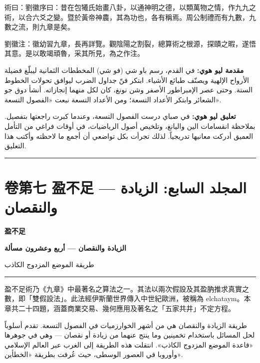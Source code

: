 \documentclass[11pt,a4paper]{article}
\newcommand{\ar}[1]{\arabicfont\beginR #1\endR}
\newcommand{\longline}{\noindent\rule{\textwidth}{0.4pt}}
\newcommand{\ChinCol}[1]{\begin{minipage}[t]{0.48\textwidth}#1\end{minipage}}
\newcommand{\ArabCol}[1]{\begin{minipage}[t]{0.48\textwidth}\arabicfont\beginR #1\endR\end{minipage}}
\newcommand{\parallelsection}[2]{%
  \noindent\ChinCol{#1}\hfill\ArabCol{#2}\par\vspace{0.5cm}%
}
\newcounter{probnum}
\begin{document}
\parallelsection{%
術曰：劉徽序曰：昔在包犧氏始畫八卦，以通神明之德，以類萬物之情，作九九之術，以合六爻之變。暨於黃帝神農，其為功也，各有稱焉。周公制禮而有九數，九數之流，則九章是矣。

劉徽注：徽幼習九章，長再詳覽。觀陰陽之割裂，總算術之根源，探賾之暇，遂悟其意。是以敢竭頑魯，采其所見，為之作注。
}{%
\textbf{مقدمة ليو هوي:} في القدم، رسم باو شي (فو شي) المخططات الثمانية ليبلّغ فضيلة الأرواح الإلهية ويصنّف طبائع الأشياء. ابتكر فنّ جداول الضرب ليوافق تحولات الخطوط الستة. وحتى عصر الإمبراطور الأصفر وشن نونغ، كان لكل منهما إنجازاته. أنشأ دوق جو الشعائر وابتكر الأعداد التسعة؛ ومن الأعداد التسعة نبعت «الفصول التسعة».

\textbf{تعليق ليو هوي:} في صباي درست الفصول التسعة، وعندما كبرت راجعتها بتفصيل. بملاحظة انقسامات الين واليانغ، وتلخيص أصول الرياضيات، في أوقات فراغي من التأمل العميق أدركت معانيها تدريجياً. لذلك تجرأت بكل تواضعي أن أجمع ما لاحظته وأكتب هذا التعليق.
}

\vspace{0.5cm}
\longline
\newpage

\setcounter{probnum}{0}

\section{卷第七 盈不足 --- \ar{المجلد السابع: الزيادة والنقصان}}
\label{sec:vol7}

\begin{center}
{\Large\bfseries\color{volcolor} 盈不足}

\vspace{0.2cm}

{\fontsize{14}{18}\selectfont\arabicfont\beginR\color{volcolor}\textbf{الزيادة والنقصان --- أربع وعشرون مسألة}\endR}

\vspace{0.2cm}

{\small\color{notecolor}\arabicfont\beginR طريقة الموضع المزدوج الكاذب\endR}
\end{center}

\vspace{0.3cm}
\longline
\vspace{0.3cm}

\parallelsection{%
盈不足術乃《九章》中最著名之算法之一。其法以兩次假設及其盈肭推求真實之數，即「雙假設法」。此法經伊斯蘭世界傳入中世紀歐洲，被稱為 elchataym。本章共二十四題，涵蓋商業交易、幾何應用及著名之「五家共井」不定方程。
}{%
طريقة الزيادة والنقصان هي من أشهر الخوارزميات في الفصول التسعة. تقدم أسلوباً لحل المسائل باستخدام تخمينين وما ينتج عنهما من زيادة أو نقصان --- وهي في جوهرها «قاعدة الموضع المزدوج الكاذب». انتقلت هذه الطريقة إلى الغرب عبر العالم الإسلامي وأوروبا في العصور الوسطى، حيث عُرفت بطريقة «الخطأين».
}
\end{document}
